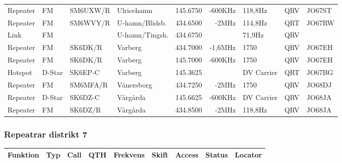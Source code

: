 \begin{landscape}
\begin{longtable}{llllrrlcl}
Repeater & FM     & SM6UXW/R & Ulricehamn          & 145.6750  & -600KHz & 118,8Hz         & QRV  & JO67ST \\
Repeater & FM     & SM6WVY/R & U-hamn/Blidsb.      & 434.6500  & -2MHz   & 114,8Hz         & QRT  & JO67RW \\
Link     & FM     &          & U-hamn/Tingsh.      & 434.6750  &         & 71,9Hz          & QRV  &        \\
Repeater & FM     & SK6DK/R  & Varberg             & 434.7000  & -1,6MHz & 1750            & QRV  & JO67EH \\
Repeater & FM     & SK6DK/R  & Varberg             & 145.7000  & -600KHz & 1750            & QRV  & JO67EH \\
Hotspot  & D-Star & SK6EP-C  & Varberg             & 145.3625  &         & DV Carrier      & QRT  & JO67BG \\
Repeater & FM     & SM6MFA/R & Vänersborg          & 434.7250  & -2MHz   & 1750            & QRV  & JO68DJ \\
Repeater & D-Star & SK6DZ-C  & Vårgårda            & 145.6625  & -600KHz & DV Carrier      & QRV  & JO68JA \\
Repeater & FM     & SK6DZ/R  & Vårgårda            & 434.8500  & -2MHz   & 118,8Hz         & QRV  & JO68JA

\end{longtable}
\normalsize
\subsubsection{Repeatrar distrikt 7}
\footnotesize
\begin{longtable}{llllrrlcl}

\textbf{Funktion} & \textbf{Typ} & \textbf{Call} & \textbf{QTH} & \textbf{Frekvens} & \textbf{Skift} & 
\textbf{Access} & \textbf{Status} & \textbf{Locator} \\ \hline \endhead


\end{longtable}
\end{landscape}
